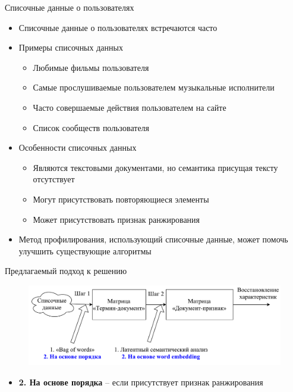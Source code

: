 \documentclass{beamer}
\begin{document}
\begin{frame}{Списочные данные о пользователях}
    \begin{itemize}
        \item {Списочные данные о пользователях встречаются часто}
        \item {Примеры списочных данных}
            \begin{itemize}
                \item {Любимые фильмы пользователя}
                \item {Самые прослушиваемые пользователем музыкальные исполнители}
                \item {Часто совершаемые действия пользователем на сайте}
                \item {Список сообществ пользователя}
            \end{itemize}
        \item {Особенности списочных данных}
            \begin{itemize}
                \item {Являются текстовыми документами, но семантика присущая тексту отсутствует}
                \item {Могут присутствовать повторяющиеся элементы}
                \item {Может присутствовать признак ранжирования}
            \end{itemize}
        \item {Метод профилирования, использующий списочные данные,
            может помочь улучшить существующие алгоритмы}
    \end{itemize}
\end{frame}

\begin{frame}{Предлагаемый подход к решению}
    \begin{figure}
        \includegraphics[width=\textwidth]{figures/presentation-concept.pdf}
    \end{figure}
    \begin{itemize}
        \item \textbf{\color{blue} 2. На основе порядка} -- если присутствует признак ранжирования
    \end{itemize}
\end{frame}
\end{document}
